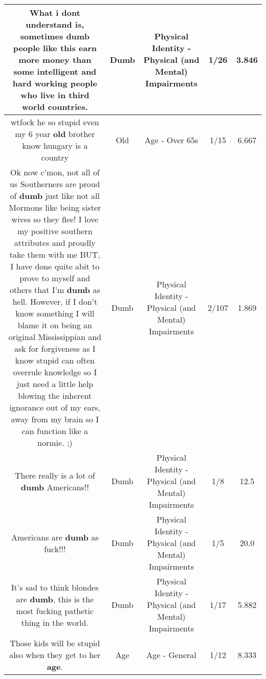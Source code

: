 \documentclass[11pt]{article}
\newlength\mylength
\begin{document}
\begin{center}
\begin{longtable}{|C{.65\mylength}|C{.30\mylength}|C{.12\mylength}|C{.12\mylength}|C{.12\mylength}|}
  \small What i dont understand is, sometimes \textbf{dumb} people like this earn more money than some intelligent and hard working people who live in third world countries.\normalsize   & Dumb & Physical Identity - Physical (and Mental) Impairments & 1/26 & 3.846 \\  \hline
  \small wtfock he so stupid even my 6 year \textbf{old} brother know hungary is a country\normalsize   & Old & Age - Over 65s & 1/15 & 6.667 \\  \hline
  \small Ok now c'mon, not all of us Southerners are proud of \textbf{dumb} just like not all Mormons like being sister wives so they flee! I love my positive southern attributes and proudly take them with me BUT, I have done quite abit to prove to myself and others that I'm \textbf{dumb} as hell. However, if I don't know something I will blame it on being an original Mississippian and ask for forgiveness as I know stupid can often overrule knowledge so I just need a little help blowing the inherent ignorance out of my ears, away from my brain so I can function like a normie. ;)\normalsize   & Dumb & Physical Identity - Physical (and Mental) Impairments & 2/107 & 1.869 \\  \hline
  \small There really is a lot of \textbf{dumb} Americans!!\normalsize   & Dumb & Physical Identity - Physical (and Mental) Impairments & 1/8 & 12.5 \\  \hline
  \small Americans are \textbf{dumb} as fuck!!!\normalsize   & Dumb & Physical Identity - Physical (and Mental) Impairments & 1/5 & 20.0 \\  \hline
  \small It's sad to think blondes are \textbf{dumb}, this is the most fucking pathetic thing in the world.\normalsize   & Dumb & Physical Identity - Physical (and Mental) Impairments & 1/17 & 5.882 \\  \hline
  \small Those kids will be stupid also when they get to her \textbf{age}.\normalsize   & Age & Age - General & 1/12 & 8.333 \\  \hline

\end{longtable}
\end{center}
\end{document}

